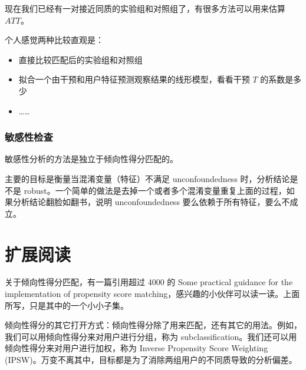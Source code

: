 \documentclass[12pt]{article}
\begin{document}
现在我们已经有一对接近同质的实验组和对照组了，有很多方法可以用来估算 $ATT $。

个人感觉两种比较直观是：
\begin{itemize}
\setlength{\itemsep}{0pt}
\setlength{\parsep}{0pt}
\setlength{\parskip}{0pt}
	\item 直接比较匹配后的实验组和对照组
	\item 拟合一个由干预和用户特征预测观察结果的线形模型，看看干预 $T$ 的系数是多少
	\item ……
\end{itemize}

\subsubsection{敏感性检查}
敏感性分析的方法是独立于倾向性得分匹配的。

主要的目标是衡量当混淆变量（特征）不满足 unconfoundedness 时，分析结论是不是 robust。一个简单的做法是去掉一个或者多个混淆变量重复上面的过程，如果分析结论翻脸如翻书，说明
unconfoundedness 要么依赖于所有特征，要么不成立。

\section{扩展阅读}
关于倾向性得分匹配，有一篇引用超过 4000 的 Some practical guidance for the implementation of propensity score matching，感兴趣的小伙伴可以读一读。上面所写，只是其中的一个小小子集。

倾向性得分的其它打开方式：倾向性得分除了用来匹配，还有其它的用法。例如，我们可以用倾向性得分来对用户进行分组，称为 subclassification。我们还可以用倾向性得分来对用户进行加权，称为 Inverse Propensity Score Weighting (IPSW)。万变不离其中，目标都是为了消除两组用户的不同质导致的分析偏差。



\end{document}
